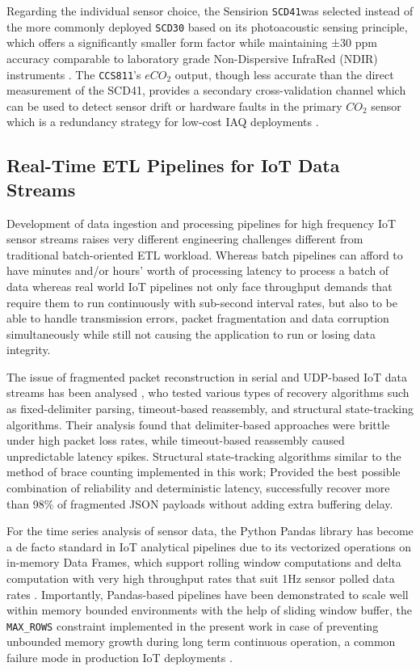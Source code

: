 \documentclass[conference]{IEEEtran}
\begin{document}
Regarding the individual sensor choice, the Sensirion \texttt{SCD41}was selected instead of the more commonly deployed \texttt{SCD30} based on its photoacoustic sensing principle, which offers a significantly smaller form factor while maintaining ±30 ppm accuracy comparable to laboratory grade Non-Dispersive InfraRed (NDIR) instruments \cite{b13}. The \texttt{CCS811}'s $eCO_2$ output, though less accurate than the direct measurement of the SCD41, provides a secondary cross-validation channel which can be used to detect sensor drift or hardware faults in the primary $CO_2$ sensor which is a redundancy strategy for low-cost IAQ deployments \cite{b14}.


\subsection{Real-Time ETL Pipelines for IoT Data Streams}

Development of data ingestion and processing pipelines for high frequency IoT sensor streams raises very different engineering challenges different from traditional batch-oriented ETL workload. Whereas batch pipelines can afford to have minutes and/or hours’ worth of processing latency to process a batch of data whereas real world IoT pipelines not only face throughput demands that require them to run continuously with sub-second interval rates, but also to be able to handle transmission errors, packet fragmentation and data corruption simultaneously while still not causing the application to run or losing data integrity.

The issue of fragmented packet reconstruction in serial and UDP-based IoT data streams has been analysed \cite{b15}, who tested various types of recovery algorithms such as fixed-delimiter parsing, timeout-based reassembly, and structural state-tracking algorithms. Their analysis found that delimiter-based approaches were brittle under high packet loss rates, while timeout-based reassembly caused unpredictable latency spikes. Structural state-tracking algorithms similar to the method of brace counting implemented in this work; Provided the best possible combination of reliability and deterministic latency, successfully recover more than 98\% of fragmented JSON payloads without adding extra buffering delay.

For the time series analysis of sensor data, the Python Pandas library has become a de facto standard in IoT analytical pipelines due to its vectorized operations on in-memory Data Frames, which support rolling window computations and delta computation with very high throughput rates that suit 1Hz sensor polled data rates \cite{b16}. Importantly, Pandas-based pipelines have been demonstrated to scale well within memory bounded environments with the help of sliding window buffer, the \texttt{MAX\_ROWS} constraint implemented in the present work in case of preventing unbounded memory growth during long term continuous operation, a common failure mode in production IoT deployments \cite{b16}.
\end{document}
